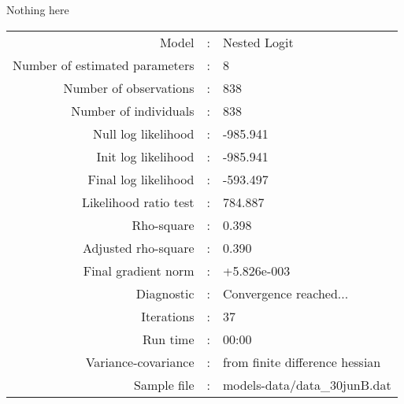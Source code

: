 Nothing here\\


\begin{flushleft}
\begin{tabular}{rcl}
\hline
Model &:& Nested Logit\\
Number of estimated parameters&:&8\\
Number of  observations &:& 838\\
Number of individuals&:&838\\
Null log likelihood&:&-985.941\\
Init log likelihood&:&-985.941\\
Final log likelihood&:&-593.497\\
Likelihood ratio test &:&784.887\\
Rho-square&:&0.398\\
Adjusted rho-square&:&0.390\\
Final gradient norm&:&+5.826e-003\\
Diagnostic&:&Convergence reached...\\
Iterations&:&37\\
Run time&:&00:00\\
Variance-covariance&:&from finite difference hessian\\
Sample file&:&models-data/data_30junB.dat\\
\end{tabular}
\end{flushleft}
